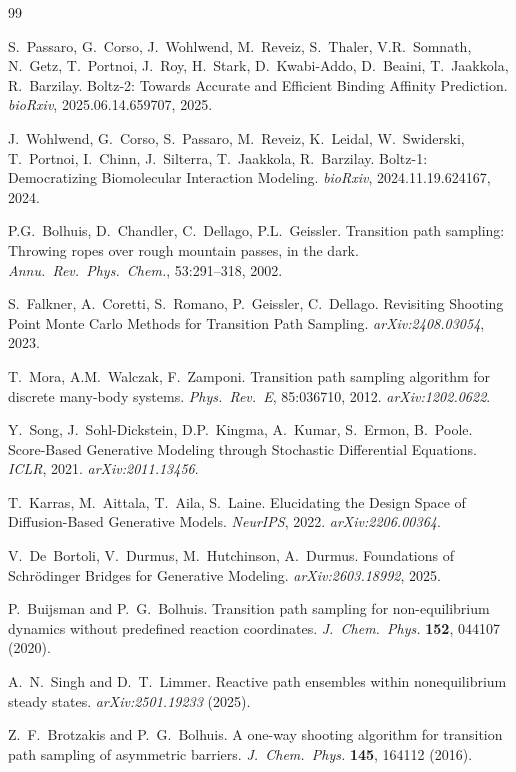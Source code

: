 \documentclass[11pt,a4paper]{article}
\begin{document}
\begin{thebibliography}{99}

S.~Passaro, G.~Corso, J.~Wohlwend, M.~Reveiz, S.~Thaler, V.R.~Somnath,
N.~Getz, T.~Portnoi, J.~Roy, H.~Stark, D.~Kwabi-Addo, D.~Beaini,
T.~Jaakkola, R.~Barzilay.
\newblock Boltz-2: Towards Accurate and Efficient Binding Affinity Prediction.
\newblock \textit{bioRxiv}, 2025.06.14.659707, 2025.

J.~Wohlwend, G.~Corso, S.~Passaro, M.~Reveiz, K.~Leidal, W.~Swiderski,
T.~Portnoi, I.~Chinn, J.~Silterra, T.~Jaakkola, R.~Barzilay.
\newblock Boltz-1: Democratizing Biomolecular Interaction Modeling.
\newblock \textit{bioRxiv}, 2024.11.19.624167, 2024.

P.G.~Bolhuis, D.~Chandler, C.~Dellago, P.L.~Geissler.
\newblock Transition path sampling: Throwing ropes over rough mountain passes,
  in the dark.
\newblock \textit{Annu.\ Rev.\ Phys.\ Chem.}, 53:291--318, 2002.

S.~Falkner, A.~Coretti, S.~Romano, P.~Geissler, C.~Dellago.
\newblock Revisiting Shooting Point Monte Carlo Methods for Transition Path
  Sampling.
\newblock \textit{arXiv:2408.03054}, 2023.

T.~Mora, A.M.~Walczak, F.~Zamponi.
\newblock Transition path sampling algorithm for discrete many-body systems.
\newblock \textit{Phys.\ Rev.\ E}, 85:036710, 2012.
\newblock \textit{arXiv:1202.0622}.

Y.~Song, J.~Sohl-Dickstein, D.P.~Kingma, A.~Kumar, S.~Ermon, B.~Poole.
\newblock Score-Based Generative Modeling through Stochastic Differential
  Equations.
\newblock \textit{ICLR}, 2021.
\newblock \textit{arXiv:2011.13456}.

T.~Karras, M.~Aittala, T.~Aila, S.~Laine.
\newblock Elucidating the Design Space of Diffusion-Based Generative Models.
\newblock \textit{NeurIPS}, 2022.
\newblock \textit{arXiv:2206.00364}.

V.~De~Bortoli, V.~Durmus, M.~Hutchinson, A.~Durmus.
\newblock Foundations of Schr\"odinger Bridges for Generative Modeling.
\newblock \textit{arXiv:2603.18992}, 2025.

P.~Buijsman and P.~G.~Bolhuis.
\newblock Transition path sampling for non-equilibrium dynamics without
  predefined reaction coordinates.
\newblock \textit{J.~Chem.\ Phys.} \textbf{152}, 044107 (2020).

A.~N.~Singh and D.~T.~Limmer.
\newblock Reactive path ensembles within nonequilibrium steady states.
\newblock \textit{arXiv:2501.19233} (2025).

Z.~F.~Brotzakis and P.~G.~Bolhuis.
\newblock A one-way shooting algorithm for transition path sampling of
  asymmetric barriers.
\newblock \textit{J.~Chem.\ Phys.} \textbf{145}, 164112 (2016).

\end{thebibliography}
\end{document}
